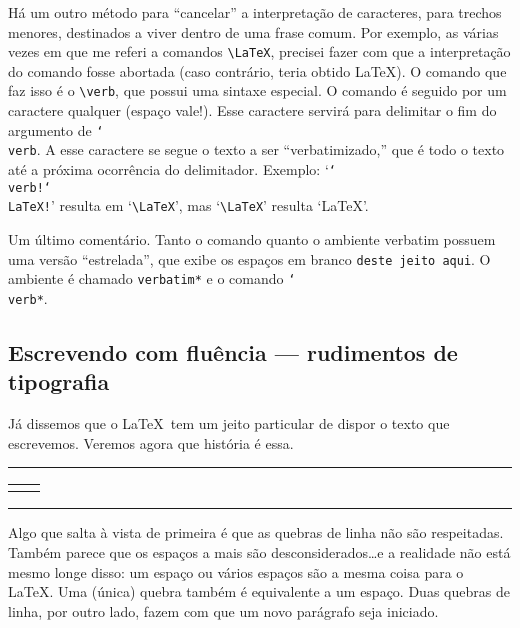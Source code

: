 Há um outro método para ``cancelar'' a interpretação de caracteres,
para trechos menores, destinados a viver dentro de uma frase
comum. Por exemplo, as várias vezes em que me referi a comandos
\verb'\LaTeX', precisei fazer com que a interpretação do comando fosse
abortada (caso contrário, teria obtido \LaTeX). O comando que faz isso
é o \verb'\verb', que possui uma sintaxe especial. O comando é seguido
por um caractere qualquer (espaço vale!). Esse caractere servirá para
delimitar o fim do argumento de \texttt{\char`\\{}verb}. A esse
caractere se segue o texto a ser ``verbatimizado,'' que é todo o texto
até a próxima ocorrência do delimitador. Exemplo:
`\texttt{\char`\\{}verb!\char`\\LaTeX!}' resulta em `\verb!\LaTeX!',
mas `\verb'\LaTeX'' resulta `\LaTeX'.

Um último comentário. Tanto o comando quanto o ambiente verbatim
possuem uma versão ``estrelada'', que exibe os espaços em branco
\verb*'deste jeito aqui'. O ambiente é chamado \verb'verbatim*' e o comando
\texttt{\char`\\{}verb*}. 

\subsection{Escrevendo com fluência --- rudimentos de tipografia}

Já dissemos que o \LaTeX\ tem um jeito particular de dispor o texto
que escrevemos. Veremos agora que história é essa.

\medskip
\noindent\begin{minipage}{\textwidth}
\begin{center}\footnotesize\hrule\smallskip
\begin{tabular}{c|c}
\begin{minipage}{.465\textwidth}

\end{minipage} &
\begin{minipage}{.465\textwidth}

\end{minipage}
\end{tabular}
\smallskip\hrule
\end{center}
\end{minipage}
\medskip

Algo que salta à vista de primeira é que as quebras de linha não são
respeitadas. Também parece que os espaços a mais são
desconsiderados\dots e a realidade não está mesmo longe disso: um
espaço ou vários espaços são a mesma coisa para o \LaTeX. Uma (única)
quebra também é equivalente a um espaço. Duas quebras de linha, por
outro lado, fazem com que um novo parágrafo seja iniciado.


